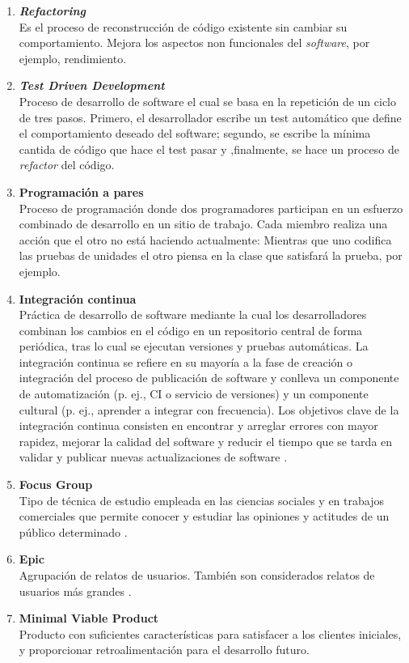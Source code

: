 \begin{enumerate}
  \item \label{refactoring} \textbf{\textit{Refactoring}}\mbox{}\\ Es el proceso de reconstrucción de código existente sin cambiar su comportamiento. Mejora los aspectos non funcionales del \textit{software}, por ejemplo, rendimiento.
  \item \label{tdd} \textbf{\textit{Test Driven Development}}\mbox{}\\ Proceso de desarrollo de software el cual se basa en la repetición de un ciclo de tres pasos. Primero, el desarrollador escribe un test automático que define el comportamiento deseado del software; segundo, se escribe la mínima cantida de código que hace el test pasar y ,finalmente, se hace un proceso de \textit{refactor} del código.
  \item \label{pair_programming} \textbf{Programación a pares}\mbox{}\\ Proceso de programación donde dos programadores participan en un esfuerzo combinado de desarrollo en un sitio de trabajo. Cada miembro realiza una acción que el otro no está haciendo actualmente: Mientras que uno codifica las pruebas de unidades el otro piensa en la clase que satisfará la prueba, por ejemplo.
  \item \label{continuous_integration} \textbf{Integración continua}\mbox{}\\ Práctica de desarrollo de software mediante la cual los desarrolladores combinan los cambios en el código en un repositorio central de forma periódica, tras lo cual se ejecutan versiones y pruebas automáticas. La integración continua se refiere en su mayoría a la fase de creación o integración del proceso de publicación de software y conlleva un componente de automatización (p. ej., CI o servicio de versiones) y un componente cultural (p. ej., aprender a integrar con frecuencia). Los objetivos clave de la integración continua consisten en encontrar y arreglar errores con mayor rapidez, mejorar la calidad del software y reducir el tiempo que se tarda en validar y publicar nuevas actualizaciones de software \cite{aws}.
  \item \label{focus_group} \textbf{Focus Group}\mbox{}\\ Tipo de técnica de estudio empleada en las ciencias sociales y en trabajos comerciales que permite conocer y estudiar las opiniones y actitudes de un público determinado \cite{abc}.
  \item \label{epic} \textbf{Epic}\mbox{}\\ Agrupación de relatos de usuarios. También son considerados relatos de usuarios más grandes \cite{epic}.
  \item \label{mvp} \textbf{Minimal Viable Product} \mbox{} \\ Producto con suficientes características para satisfacer a los clientes iniciales, y proporcionar retroalimentación para el desarrollo futuro.
\end{enumerate}
